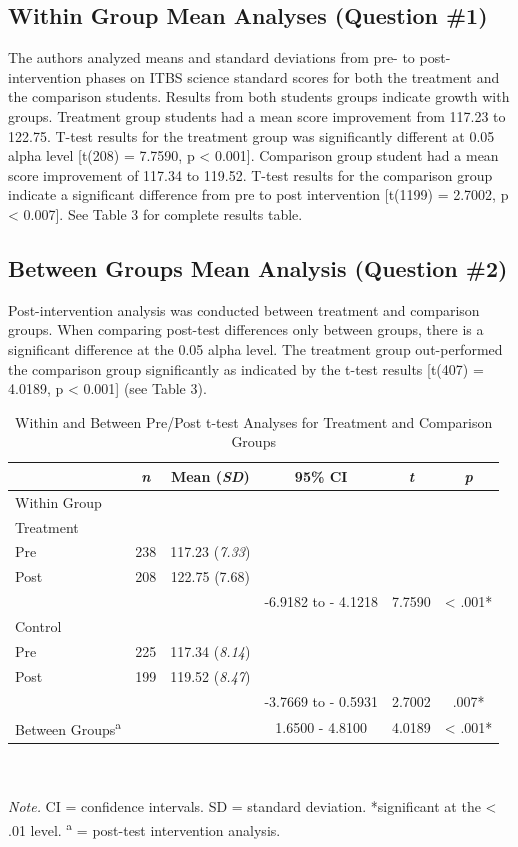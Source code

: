 \documentclass[11.5pt]{sig-alternate} %
\begin{document}
\begin{large}
\subsection*{Within Group Mean Analyses (Question \#1)}

The authors analyzed means and standard deviations from pre- to post-intervention phases on ITBS science standard scores for both the treatment and the comparison students.  Results from both students groups indicate growth with groups.  Treatment group students had a mean score improvement from 117.23 to 122.75.  T-test results for the treatment group was significantly different at 0.05 alpha level [t(208) = 7.7590, p < 0.001].  Comparison group student had a mean score improvement of 117.34 to 119.52.  T-test results for the comparison group indicate a significant difference from pre to post intervention [t(1199) = 2.7002, p < 0.007].  See Table 3 for complete results table.  

\subsection*{Between Groups Mean Analysis (Question \#2)}

Post-intervention analysis was conducted between treatment and comparison groups.  When comparing post-test differences only between groups, there is a significant difference at the 0.05 alpha level.  The treatment group out-performed the comparison group significantly as indicated by the t-test results [t(407) = 4.0189, p < 0.001] (see Table 3).  

\begin{table}[th]
\caption{Within and Between Pre/Post t-test Analyses for Treatment and Comparison Groups}
\begin{tabular}{lccccc}
\hline
 & \textit{n} & Mean (\textit{SD}) & 95\% CI & \textit{t} & \textit{p} \\ \hline
Within Group & & & & & \\
Treatment & & & & & \\
\cline{1-1}
Pre & 238 & 117.23 (\textit{7.33}) & & & \\
Post & 208 & 122.75 (7.68) & & & \\
 &  &  & -6.9182 to - 4.1218 & 7.7590 & < .001* \\
Control  &  &  &  &  & \\
\cline{1-1}
Pre & 225 & 117.34 (\textit{8.14}) &  &  & \\
Post & 199 & 119.52 (\textit{8.47}) &  &  & \\
 &  &  & -3.7669 to - 0.5931 & 2.7002 & .007* \\
Between Groups\textsuperscript{a} &  &  & 1.6500 - 4.8100 & 4.0189 & < .001* \\ \hline
\end{tabular}
\\ \\ \textit{Note.}  CI = confidence intervals. SD = standard deviation. *significant at the < .01 level. \textsuperscript{a} = post-test intervention analysis.
\end{table}


\end{large}
\end{document}
